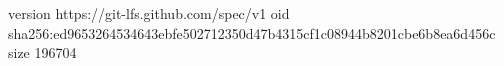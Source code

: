 version https://git-lfs.github.com/spec/v1
oid sha256:ed9653264534643ebfe502712350d47b4315cf1c08944b8201cbe6b8ea6d456c
size 196704
